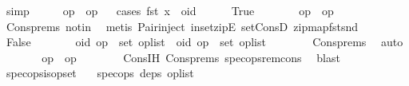 \begin{isabellebody}
\ simp\isanewline
\ \ \isamarkupfalse%
\ \isamarkupfalse%
\ {\isachardoublequoteopen}op{}\ {\isacharequal}\ op{}{\isachardoublequoteclose}\isanewline
\ \ \isamarkupfalse%
{\isacharparenleft}cases\ {\isachardoublequoteopen}fst\ x\ {\isacharequal}\ oid{\isachardoublequoteclose}{\isacharparenright}\isanewline
\ \ \ \ \isamarkupfalse%
\ True\isanewline
\ \ \ \ \isamarkupfalse%
\ \isamarkupfalse%
\ {\isachardoublequoteopen}op{}\ {\isacharequal}\ op{}{\isachardoublequoteclose}\isanewline
\ \ \ \ \ \ \isamarkupfalse%
\ Cons{\isachardot}prems\ notin\ \isamarkupfalse%
\ {\isacharparenleft}metis\ Pair{\isacharunderscore}inject\ in{\isacharunderscore}set{\isacharunderscore}zipE\ set{\isacharunderscore}ConsD\ zip{\isacharunderscore}map{\isacharunderscore}fst{\isacharunderscore}snd{\isacharparenright}\isanewline
\ \ \isamarkupfalse%
\isanewline
\ \ \ \ \isamarkupfalse%
\ False\isanewline
\ \ \ \ \isamarkupfalse%
\ \isamarkupfalse%
\ {\isachardoublequoteopen}{\isacharparenleft}oid{\isacharcomma}\ op{}{\isacharparenright}\ {\isasymin}\ set\ op{\isacharunderscore}list{\isachardoublequoteclose}\ \ {\isachardoublequoteopen}{\isacharparenleft}oid{\isacharcomma}\ op{}{\isacharparenright}\ {\isasymin}\ set\ op{\isacharunderscore}list{\isachardoublequoteclose}\isanewline
\ \ \ \ \ \ \isamarkupfalse%
\ Cons{\isachardot}prems\ \isamarkupfalse%
\ auto\isanewline
\ \ \ \ \isamarkupfalse%
\ \isamarkupfalse%
\ {\isachardoublequoteopen}op{}\ {\isacharequal}\ op{}{\isachardoublequoteclose}\isanewline
\ \ \ \ \ \ \isamarkupfalse%
\ Cons{\isachardot}IH\ Cons{\isachardot}prems{\isacharparenleft}{}{\isacharparenright}\ spec{\isacharunderscore}ops{\isacharunderscore}rem{\isacharunderscore}cons\ \isamarkupfalse%
\ blast\isanewline
\ \ \isamarkupfalse%
\isanewline
{}\isamarkupfalse%
%
\endisatagproof
{\isafoldproof}%
%
\isadelimproof
\isanewline
%
\endisadelimproof
\isanewline
{}\isamarkupfalse%
\ spec{\isacharunderscore}ops{\isacharunderscore}is{\isacharunderscore}opset{\isacharcolon}\isanewline
\ \ \ {\isachardoublequoteopen}spec{\isacharunderscore}ops\ deps\ op{\isacharunderscore}list{\isachardoublequoteclose}\isanewline

\end{isabellebody}
